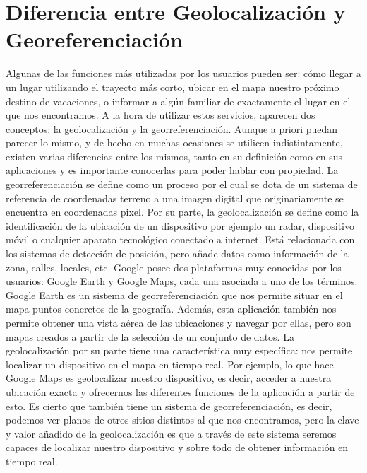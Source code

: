 \section{Diferencia entre Geolocalización y Georeferenciación}
Algunas de las funciones más utilizadas por los usuarios pueden ser: cómo llegar a un lugar utilizando el trayecto más corto, ubicar en el mapa nuestro próximo destino de vacaciones, o informar a algún familiar de exactamente el lugar en el que nos encontramos. A la hora de utilizar estos servicios, aparecen dos conceptos: la geolocalización y la georreferenciación.
Aunque a priori puedan parecer lo mismo, y de hecho en muchas ocasiones se utilicen indistintamente, existen varias diferencias entre los mismos, tanto en su definición como en sus aplicaciones y es importante conocerlas para poder hablar con propiedad. La georreferenciación se define como un proceso por el cual se dota de un sistema de referencia de coordenadas terreno a una imagen digital que originariamente se encuentra en coordenadas pixel.
Por su parte, la geolocalización se define como la identificación de la ubicación de un dispositivo por ejemplo un radar, dispositivo móvil o cualquier aparato tecnológico conectado a internet. Está relacionada con los sistemas de detección de posición, pero añade datos como información de la zona, calles, locales, etc.
Google posee dos plataformas muy conocidas por los usuarios: Google Earth y Google Maps, cada una asociada a uno de los términos. 
Google Earth es un sistema de georreferenciación que nos permite situar en el mapa puntos concretos de la geografía. Además, esta aplicación también nos permite obtener una vista aérea de las ubicaciones y navegar por ellas, pero son mapas creados a partir de la selección de un conjunto de datos.
La geolocalización por su parte tiene una característica muy específica: nos permite localizar un dispositivo en el mapa en tiempo real. Por ejemplo, lo que hace Google Maps es geolocalizar nuestro dispositivo, es decir, acceder a nuestra ubicación exacta y ofrecernos las diferentes funciones de la aplicación a partir de esto.
Es cierto que también tiene un sistema de georreferenciación, es decir, podemos ver planos de otros sitios distintos al que nos encontramos, pero la clave y valor añadido de la geolocalización es que a través de este sistema seremos capaces de localizar nuestro dispositivo y sobre todo de obtener información en tiempo real.

